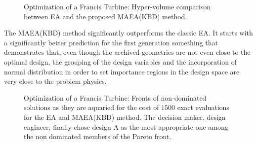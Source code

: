 \begin{figure}[h!]
\begin{minipage}[b]{1\linewidth}
 \centering
\end{minipage}
\caption{Optimization of a Francis Turbine: Hyper-volume comparison between EA and the proposed MAEA(KBD) method.}
\label{Francis-Res}
\end{figure}

The MAEA(KBD) method significantly outperforms the classic EA. It starts with a significantly better prediction for the first generation something that demonstrates that, even though the  archived geometries are not even close to the optimal design, the grouping of the design variables and the incorporation of normal distribution in order to set importance regions in the design space are very close to the problem physics.    

\begin{figure}[h!]
\begin{minipage}[b]{1\linewidth}
 \centering
\end{minipage}
\caption{Optimization of a Francis Turbine: Fronts of non-dominated solutions as they are aquaried for the cost of $1500$ exact evaluations for the EA and MAEA(KBD) method. The decision maker, design engineer, finally chose design A as the most appropriate one among the non dominated members of the Pareto front.}
\label{Francis-Res-par}
\end{figure}

